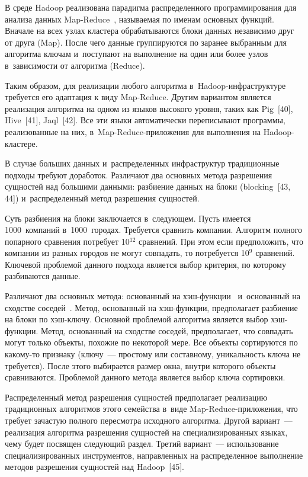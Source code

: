 \begin{multicols}{2}
  В среде Hadoop реализована парадигма распределенного программирования для анализа
данных Map-Reduce~\cite{38-vov, 39-vov}, называемая по именам основных функций.
Вначале на всех узлах кластера обрабатываются блоки данных независимо друг от друга
(Map). После чего данные группируются по заранее выбранным для алгоритма ключам
и~поступают на выполнение на один или более узлов в~зависимости от алгоритма (Reduce).

  Таким образом, для реализации любого алгоритма в~Hadoop-инфра\-струк\-ту\-ре
требуется его адап\-тация к виду Map-Reduce. Другим вариантом яв\-ля\-ется реализация
алгоритма на одном из языков \mbox{высокого} уровня, таких как Pig~[40], Hive~[41], Jaql~[42]. Все
эти языки автоматически переписывают программы, реализованные на них,
  в~Map-Reduce-при\-ло\-же\-ния для выполнения на Hadoop-клас\-тере.

  В случае больших данных и~распределенных инфраструктур традиционные подходы
требуют доработок. Различают два основных метода разрешения сущностей над большими
данными: разбиение данных на блоки (blocking~[43, 44]) и~распределенный метод
разрешения сущностей.

  Суть разбиения на блоки заключается в~сле\-ду\-ющем. Пусть имеется 1000~компаний
в~1000~городах. Требуется сравнить компании. Алгоритм полного попарного сравнения
потребует 10$^{12}$ сравнений. При этом если предположить, что компании из разных
городов не могут совпадать, то потребуется 10$^9$ сравнений. Ключевой проблемой данного
подхода является выбор критерия, по которому разбиваются данные.

Различают два
основных метода: основанный на хэш-функ\-ции~\cite{8-vov} и~основанный на сходстве
соседей~\cite{8-vov}. Метод, основанный на хэш-функ\-ции, предполагает разбиение на
блоки по хэш-клю\-чу. Основной проблемой алгоритма является выбор хэш-функ\-ции.
Метод, основанный на сходстве соседей, предполагает, что совпадать могут только объекты,
похожие по некоторой мере. Все объекты сортируются по ка\-ко\-му-то признаку (ключу~---
простому или составному, уникальность ключа не требуется). После этого выбирается
размер окна, внутри которого объекты сравниваются. Проблемой данного метода является
выбор ключа сортировки.

  Распределенный метод разрешения сущностей предполагает реализацию традиционных
алгоритмов этого семейства в~виде Map-Reduce-при\-ло\-же\-ния, что требует зачастую
полного пересмотра исходного алгоритма. Другой вариант~--- реализация алгоритма
разрешения сущностей на специализированных языках, чему будет посвящен сле\-ду\-ющий
раздел. Третий вариант~--- использование специализированных инструментов,
направленных на распределенное выполнение методов разрешения сущностей над
Hadoop~[45].


\end{multicols}
